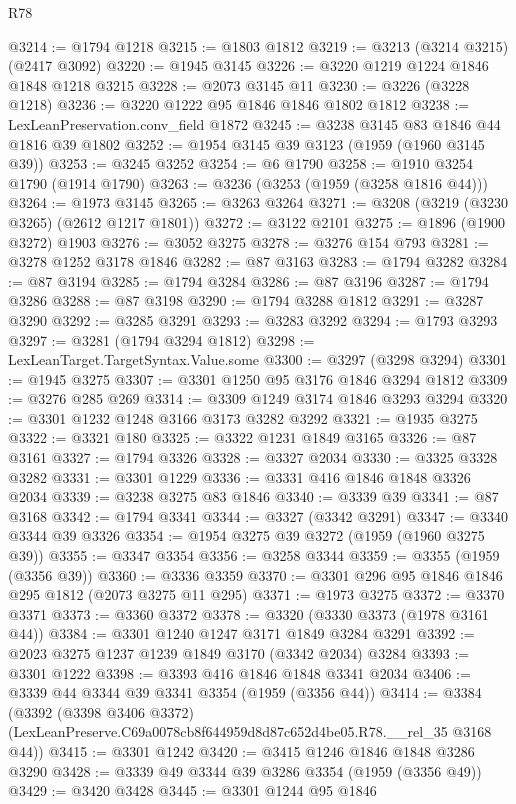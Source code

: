 \begin{lexlean}{R78}
\begin{coremodule}
@3214 := @1794 @1218
@3215 := @1803 @1812
@3219 := @3213 (@3214 @3215) (@2417 @3092)
@3220 := @1945 @3145
@3226 := @3220 @1219 @1224 @1846 @1848 @1218 @3215
@3228 := @2073 @3145 @11
@3230 := @3226 (@3228 @1218)
@3236 := @3220 @1222 @95 @1846 @1846 @1802 @1812
@3238 := LexLeanPreservation.conv_field @1872
@3245 := @3238 @3145 @83 @1846 @44 @1816 @39 @1802
@3252 := @1954 @3145 @39 @3123 (@1959 (@1960 @3145 @39))
@3253 := @3245 @3252
@3254 := @6 @1790
@3258 := @1910 @3254 @1790 (@1914 @1790)
@3263 := @3236 (@3253 (@1959 (@3258 @1816 @44)))
@3264 := @1973 @3145
@3265 := @3263 @3264
@3271 := @3208 (@3219 (@3230 @3265) (@2612 @1217 @1801))
@3272 := @3122 @2101
@3275 := @1896 (@1900 @3272) @1903
@3276 := @3052 @3275
@3278 := @3276 @154 @793
@3281 := @3278 @1252 @3178 @1846
@3282 := @87 @3163
@3283 := @1794 @3282
@3284 := @87 @3194
@3285 := @1794 @3284
@3286 := @87 @3196
@3287 := @1794 @3286
@3288 := @87 @3198
@3290 := @1794 @3288 @1812
@3291 := @3287 @3290
@3292 := @3285 @3291
@3293 := @3283 @3292
@3294 := @1793 @3293
@3297 := @3281 (@1794 @3294 @1812)
@3298 := LexLeanTarget.TargetSyntax.Value.some
@3300 := @3297 (@3298 @3294)
@3301 := @1945 @3275
@3307 := @3301 @1250 @95 @3176 @1846 @3294 @1812
@3309 := @3276 @285 @269
@3314 := @3309 @1249 @3174 @1846 @3293 @3294
@3320 := @3301 @1232 @1248 @3166 @3173 @3282 @3292
@3321 := @1935 @3275
@3322 := @3321 @180
@3325 := @3322 @1231 @1849 @3165
@3326 := @87 @3161
@3327 := @1794 @3326
@3328 := @3327 @2034
@3330 := @3325 @3328 @3282
@3331 := @3301 @1229
@3336 := @3331 @416 @1846 @1848 @3326 @2034
@3339 := @3238 @3275 @83 @1846
@3340 := @3339 @39
@3341 := @87 @3168
@3342 := @1794 @3341
@3344 := @3327 (@3342 @3291)
@3347 := @3340 @3344 @39 @3326
@3354 := @1954 @3275 @39 @3272 (@1959 (@1960 @3275 @39))
@3355 := @3347 @3354
@3356 := @3258 @3344
@3359 := @3355 (@1959 (@3356 @39))
@3360 := @3336 @3359
@3370 := @3301 @296 @95 @1846 @1846 @295 @1812 (@2073 @3275 @11 @295)
@3371 := @1973 @3275
@3372 := @3370 @3371
@3373 := @3360 @3372
@3378 := @3320 (@3330 @3373 (@1978 @3161 @44))
@3384 := @3301 @1240 @1247 @3171 @1849 @3284 @3291
@3392 := @2023 @3275 @1237 @1239 @1849 @3170 (@3342 @2034) @3284
@3393 := @3301 @1222
@3398 := @3393 @416 @1846 @1848 @3341 @2034
@3406 := @3339 @44 @3344 @39 @3341 @3354 (@1959 (@3356 @44))
@3414 := @3384
    (@3392
      (@3398 @3406 @3372)
      (LexLeanPreserve.C69a0078cb8f644959d8d87c652d4be05.R78.__rel_35 @3168 @44))
@3415 := @3301 @1242
@3420 := @3415 @1246 @1846 @1848 @3286 @3290
@3428 := @3339 @49 @3344 @39 @3286 @3354 (@1959 (@3356 @49))
@3429 := @3420 @3428
@3445 := @3301
    @1244
    @95
    @1846

\end{coremodule}
\end{lexlean}
